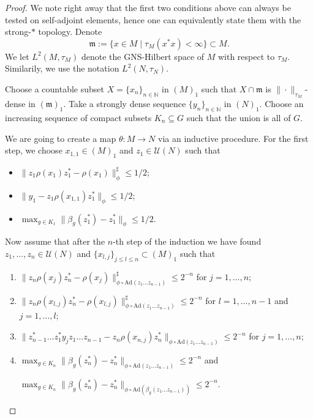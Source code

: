 \documentclass[11pt,a4paper]{article}
\theoremstyle{definition}
\theoremstyle{remark}
\numberwithin{equation}{section}
\numberwithin{theorem}{section}
\newcommand{\N}{\mathbb{N}}
\begin{document}
\begin{proof}
We note right away that the first two conditions above can always be tested on self-adjoint elements, hence one can equivalently state them with the strong-$*$ topology. 
Denote
\[\mathfrak{m} := \{x \in M \mid \tau_M(x^*x) < \infty\} \subset M.\]
We let $L^2(M,\tau_M)$ denote the GNS-Hilbert space of $M$ with respect to $\tau_M$.
Similarily, we use the notation $L^2(N, \tau_N)$.

Choose a countable subset $X = \{x_n\}_{n \in \N}$ in $(M)_1$ such that $X \cap \mathfrak{m}$ is $\|\cdot\|_{\tau_M}$-dense in $(\mathfrak{m})_1$. 
Take a strongly dense sequence $\{y_n\}_{n \in \N}$ in $(N)_1$.
Choose an increasing sequence of compact subsets $K_n \subseteq G$ such that the union is all of $G$. 

We are going to create a map $\theta: M\to N$ via an inductive procedure. 
For the first step, we choose $x_{1,1} \in (M)_1$ and $z_1 \in \mathcal{U}(N)$ such that
\begin{itemize}
\item $ \|z_1 \rho(x_1) z_1^* - \rho(x_1)\|^\sharp_\phi \leq 1/2$;
\item $\|y_1 - z_1\rho(x_{1,1})z_1^*\|_\phi \leq 1/2$;
\item $\max_{g \in K_1} \|\beta_g(z_1^*) - z_1^*\|_\phi \leq 1/2$.
\end{itemize}
Now assume that after the $n$-th step of the induction we have found $z_1, \hdots, z_n \in \mathcal{U}(N)$ and ${\{x_{l,j}\}_{j \leq l \leq n} \subset (M)_1}$ such that
\begin{enumerate}
\item $\|z_n \rho(x_j) z_n^* - \rho(x_j)\|^\sharp_{\phi \circ \mathrm{Ad}(z_1 \hdots z_{n-1})} \leq 2^{-n}$ for $j= 1, \hdots, n$; \label{eq:commutation_dense}
\item $\|z_n \rho(x_{l,j}) z_n^* - \rho(x_{l,j})\|^\sharp_{\phi \circ \mathrm{Ad}(z_1 \hdots z_{n-1})} \leq 2^{-n}$ for $l=1, \hdots, n-1$ and $j = 1, \hdots, l$; \label{eq:commutation_close_elements}
\item $ \|  z_{n-1}^* \hdots z_1^*  y_j z_1 \hdots z_{n-1} - z_n\rho(x_{n,j})z_n^*\|_{\phi \circ \mathrm{Ad}(z_1 \hdots z_{n-1})} \leq 2^{-n}$ for $j=1, \hdots, n$; \label{eq:close_elements}
\item 
$\max_{g \in K_n} \|\beta_g(z_n^*) - z_n^*\|_{\phi \circ \mathrm{Ad}(z_1 \hdots z_{n-1})} \leq 2^{-n}$ and

$\max_{g \in K_n} \|\beta_g(z_n^*) - z_n^*\|_{\phi \circ \mathrm{Ad}(\beta_g(z_1 \hdots z_{n-1}))} \leq 2^{-n}$.
 \label{eq:invariance}


\end{enumerate}
\end{proof}
\end{document}
